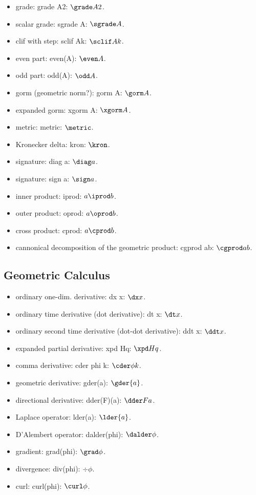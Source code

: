 \begin{multicols}{2}
\begin{itemize}
\item grade: grade A2: $\grade A2$.
\item scalar grade: sgrade A: $\sgrade A$.
\item clif with step: sclif Ak: $\sclif Ak$.
\item even part: even(A): $\even A$.
\item odd part: odd(A): $\odd A$.
\item gorm (geometric norm?): gorm A: $\gorm A$.
\item expanded gorm: xgorm A: $\xgorm A$.
\item metric: metric: $\metric$.
\item Kronecker delta: kron: $\kron$.
\item signature: diag a: $\diag a$.
\item signature: sign a: $\sign a$.
\item inner product: iprod: $a\iprod b$.
\item outer product: oprod: $a\oprod b$.
\item cross product: cprod: $a\cprod b$.
\item cannonical decomposition of the geometric product: cgprod ab: $\cgprod ab$.
\end{itemize}


\subsection{Geometric Calculus}
\begin{itemize}
\item ordinary one-dim. derivative: dx x: $\dx x$.
\item ordinary time derivative (dot derivative): dt x: $\dt x$.
\item ordinary second time derivative (dot-dot derivative): ddt x: $\ddt x$.
\item expanded partial derivative: xpd Hq: $\xpd Hq$.
\item comma derivative: cder phi k: $\cder\phi k$.
\item geometric derivative: gder(a): $\gder{a}$.
\item directional derivative: dder(F)(a): $\dder F{a}$.
\item Laplace operator: lder(a): $\lder{a}$.
\item D'Alembert operator: dalder(phi): $\dalder\phi$.
\item gradient: grad(phi): $\grad\phi$.
\item divergence: div(phi): $\div\phi$.
\item curl: curl(phi): $\curl\phi$.
\end{itemize}



\end{multicols}
